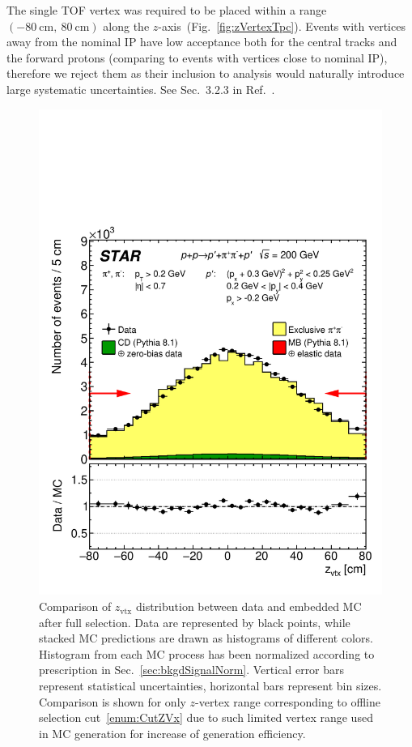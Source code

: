 The single TOF vertex was required to be placed within a range $(-80~\text{cm},~80~\text{cm})$ along the $z$-axis~(Fig.~\ref{fig:zVertexTpc}). Events with vertices away from the nominal IP have low acceptance both for the central tracks and the forward protons (comparing to events with vertices close to nominal IP), therefore we reject them as their inclusion to analysis would naturally introduce large systematic uncertainties. See Sec.~3.2.3 in Ref.~\cite{supplementaryNote}.

\begin{figure}[h]
\centering%
\parbox{0.5325\textwidth}{%
  \centering%
  \includegraphics[width=\linewidth]{graphics/backgrounds/dataVsMc/Ratio_Linear_ZVtx.pdf} 
}%
\quad%
\parbox{0.4125\textwidth}{%
    \caption[Comparison of $z_{\text{vtx}}$ distribution between data and embedded MC.]{Comparison of $z_{\text{vtx}}$ distribution between data and embedded MC after full selection. Data are represented by black points, while stacked MC predictions are drawn as histograms of different colors. Histogram from each MC process has been normalized according to prescription in Sec.~\ref{sec:bkgdSignalNorm}. Vertical error bars represent statistical uncertainties, horizontal bars represent bin sizes. Comparison is shown for only $z$-vertex range corresponding to offline selection cut~\ref{enum:CutZVx} due to such limited vertex range used in MC generation for increase of generation efficiency.}\label{fig:Ratio_Linear_ZVtx} %
}
\end{figure}


